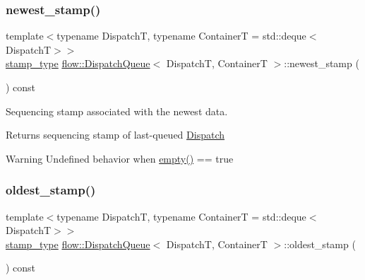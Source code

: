 \subsubsection{\texorpdfstring{newest\+\_\+stamp()}{newest\_stamp()}}
{\footnotesize\ttfamily template$<$typename DispatchT, typename ContainerT = std\+::deque$<$\+Dispatch\+T$>$$>$ \\
\hyperlink{classflow_1_1_dispatch_queue_a7908f3d78b7f1767462244b94434d748}{stamp\+\_\+type} \hyperlink{classflow_1_1_dispatch_queue}{flow\+::\+Dispatch\+Queue}$<$ DispatchT, ContainerT $>$\+::newest\+\_\+stamp (\begin{DoxyParamCaption}{ }\end{DoxyParamCaption}) const\hspace{0.3cm}{\ttfamily [inline]}}



Sequencing stamp associated with the newest data. 

\begin{DoxyReturn}{Returns}
sequencing stamp of last-\/queued \hyperlink{classflow_1_1_dispatch}{Dispatch}
\end{DoxyReturn}
\begin{DoxyWarning}{Warning}
Undefined behavior when {\ttfamily \hyperlink{classflow_1_1_dispatch_queue_a447412abd83540a6c595dd7a17116c6c}{empty()} == true} 
\end{DoxyWarning}
\mbox{\label{classflow_1_1_dispatch_queue_a6411ccf159a54568dc00072b35593189}} 
\subsubsection{\texorpdfstring{oldest\+\_\+stamp()}{oldest\_stamp()}}
{\footnotesize\ttfamily template$<$typename DispatchT, typename ContainerT = std\+::deque$<$\+Dispatch\+T$>$$>$ \\
\hyperlink{classflow_1_1_dispatch_queue_a7908f3d78b7f1767462244b94434d748}{stamp\+\_\+type} \hyperlink{classflow_1_1_dispatch_queue}{flow\+::\+Dispatch\+Queue}$<$ DispatchT, ContainerT $>$\+::oldest\+\_\+stamp (\begin{DoxyParamCaption}{ }\end{DoxyParamCaption}) const\hspace{0.3cm}{\ttfamily [inline]}}




